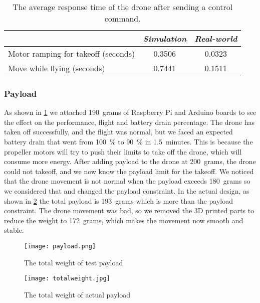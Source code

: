 \documentclass[../main.tex]{subfiles}
\begin{document}
\begin{table}[H]
	\centering
	\caption{The average response time of the drone after sending a control command.}
	\label{tab:respone-time}
	\begin{tabularx}{0.7\textwidth}{ X c c }
		\toprule
		\textit{} & \textit{Simulation} & \textit{Real-world}\\ \midrule
		Motor ramping for takeoff (seconds)  & 0.3506 & 0.0323     \\
		Move while flying (seconds) & 0.7441  & 0.1511   \\
		\bottomrule
	\end{tabularx}
\end{table} 

\subsubsection{Payload}

As shown in \cref{fig:payload}
we attached \SI{190}{grams} of Raspberry Pi and Arduino boards
to see the effect on the performance, flight and
battery drain percentage. 
The drone has taken off  successfully, 
and the flight was normal, but we faced an expected 
battery drain that went from 
\SI{100}{\percent} to \SI{90}{\percent} in 
\SI{1.5}{minutes}. This is because the propeller motors will try to push 
their limits to take off the drone, which will consume more energy.
After adding payload to the drone at \SI{200}{grams}, the drone could not
takeoff, and we now know the payload limit for the takeoff. 
We noticed that the drone movement
is not normal when the payload exceeds \SI{180}{grams} 
so we considered that and changed
the payload constraint. In the actual design, as shown in 
\cref{fig:actual-total-weight} the total payload 
is \SI{193}{grams} which is more than the payload constraint. 
The drone movement was bad, so we removed the 3D printed
parts to reduce the weight to \SI{172}{grams}, 
which makes the movement now smooth and stable.



\begin{figure}[H]
	\centering
	\texttt{[image: payload.png]}
	\caption{The total weight of test payload}
	\label{fig:payload}
\end{figure} 

\begin{figure}[H]
	\centering
	\texttt{[image: totalweight.jpg]}
	\caption{The total weight of actual payload}
	\label{fig:actual-total-weight}
\end{figure} 
\end{document}
